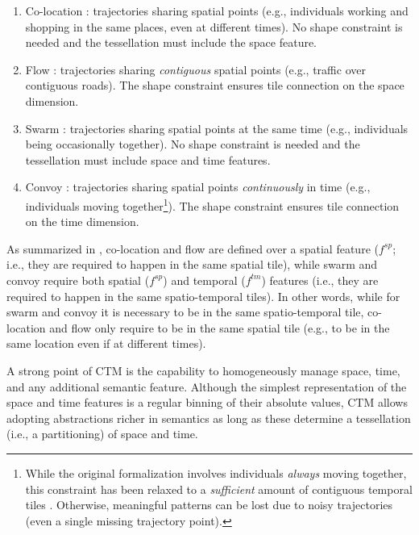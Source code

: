 \documentclass[preprint,12pt,authoryear]{elsarticle} %
\begin{document}
\begin{enumerate}[label=(\alph*)]
    \item Co-location \citep{DBLP:journals/isci/FranciaGR20}: trajectories sharing spatial points (e.g., individuals working and shopping in the same places, even at different times). No shape constraint is needed and the tessellation must include the space feature.
    \item Flow \citep{DBLP:journals/tmc/HanLO15}: trajectories sharing \textit{contiguous} spatial points (e.g., traffic over contiguous roads).
    The shape constraint ensures tile connection on the space dimension.
    \item Swarm \citep{DBLP:journals/pvldb/LiDHK10}: trajectories sharing spatial points at the same time (e.g., individuals being occasionally together). No shape constraint is needed and the tessellation must include space and time features.
    \item Convoy \citep{DBLP:journals/pvldb/JeungYZJS08}: trajectories sharing spatial points \textit{continuously} in time (e.g., individuals moving together\footnote{While the original formalization involves individuals \textit{always} moving together, this constraint has been relaxed to a \textit{sufficient} amount of contiguous temporal tiles \citep{DBLP:journals/pvldb/FanZWT16}. Otherwise, meaningful patterns can be lost due to noisy trajectories (even a single missing trajectory point).}). The shape constraint ensures tile connection on the time dimension.
\end{enumerate}

As summarized in , co-location and flow are defined over a spatial feature ($f^{sp}$; i.e., they are required to happen in the same spatial tile), while swarm and convoy require both spatial ($f^{sp}$) and temporal ($f^{tm}$) features (i.e., they are required to happen in the same spatio-temporal tiles).
In other words, while for swarm and convoy it is necessary to be in the same spatio-temporal tile, co-location and flow only require to be in the same spatial tile (e.g., to be in the same location even if at different times).

A strong point of CTM is the capability to homogeneously manage space, time, and any additional semantic feature.
Although the simplest representation of the space and time features is a regular binning of their absolute values, CTM allows adopting abstractions richer in semantics as long as these determine a tessellation (i.e., a partitioning) of space and time.
\end{document}
